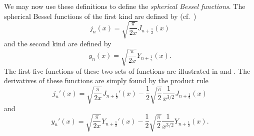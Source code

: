 We may now use these definitions to define the \textit{spherical Bessel functions}. The spherical Bessel functions of the first kind are defined by (cf.~\cite[p. 437]{Abramovitz1964ham})
\begin{equation*}
	j_n(x) = \sqrt{\frac{\pi}{2x}}J_{n+\frac{1}{2}}(x)
\end{equation*}
and the second kind are defined by
\begin{equation*}
	y_n(x) = \sqrt{\frac{\pi}{2x}}Y_{n+\frac{1}{2}}(x).
\end{equation*}
The first five functions of these two sets of functions are illustrated in  and . The derivatives of these functions are simply found by the product rule
\begin{equation*}
	j_n'(x) = \sqrt{\frac{\pi}{2x}}J_{n+\frac{1}{2}}'(x) -\frac{1}{2} \sqrt{\frac{\pi}{2}}\frac{1}{x^{3/2}}J_{n+\frac{1}{2}}(x)
\end{equation*}
and
\begin{equation*}
	y_n'(x) = \sqrt{\frac{\pi}{2x}}Y_{n+\frac{1}{2}}'(x) -\frac{1}{2} \sqrt{\frac{\pi}{2}}\frac{1}{x^{3/2}}Y_{n+\frac{1}{2}}(x).
\end{equation*}

